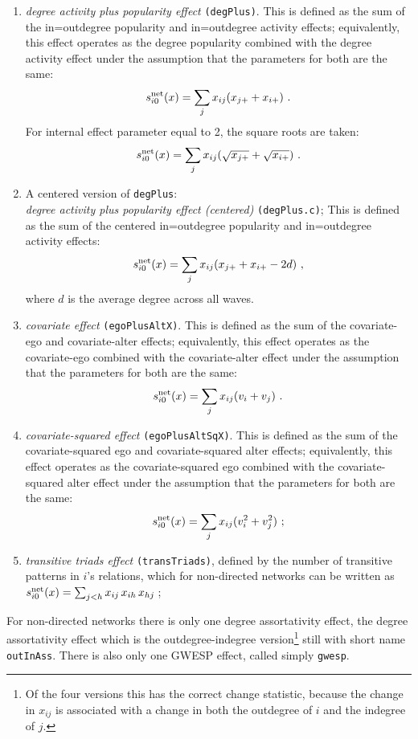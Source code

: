\documentclass[a4paper,fleqn,11pt]{article}
\newcommand{\+}{\, + \,}
\newcommand{\vit}{\theenumi}
\begin{document}
\begin{enumerate}
\item \emph{degree activity plus popularity effect} \texttt{(degPlus)}.
     This is defined as the sum of the in=outdegree popularity
     and in=outdegree activity effects; equivalently, this effect
     operates as the degree popularity combined with the degree activity effect
     under the assumption that the parameters for both are the same:
\[
 s^{\rm net}_{i\vit}(x) = \sum_j x_{ij} (x_{j+} + x_{i+}) \ .
\]
    For internal effect parameter equal to 2, the square roots are taken:
\[
 s^{\rm net}_{i\vit}(x) = \sum_j x_{ij} (\sqrt{x_{j+}} + \sqrt{x_{i+}}) \ .
\]
\item A centered version of \texttt{degPlus}:\\
      \emph{degree activity plus popularity effect (centered)} \texttt{(degPlus.c)};
     This is defined as the sum of the centered in=outdegree popularity
     and in=outdegree activity effects:
\[
 s^{\rm net}_{i\vit}(x) = \sum_j x_{ij} (x_{j+} + x_{i+} - 2 d) \ ,
\]
   where $d$ is the average degree across all waves.
\item \emph{covariate effect} \texttt{(egoPlusAltX)}.
     This is defined as the sum of the covariate-ego and
     covariate-alter effects; equivalently, this effect
     operates as the covariate-ego combined with the covariate-alter effect
     under the assumption that the parameters for both are the same:
\[
 s^{\rm net}_{i\vit}(x) = \sum_j x_{ij} (v_i + v_j) \ .
\]
\item \emph{covariate-squared effect} \texttt{(egoPlusAltSqX)}.
     This is defined as the sum of the covariate-squared ego and
     covariate-squared alter effects; equivalently, this effect
     operates as the covariate-squared ego combined with the
     covariate-squared alter effect
     under the assumption that the parameters for both are the same:
\[
 s^{\rm net}_{i\vit}(x) = \sum_j x_{ij} (v_i^2 + v_j^2) \ ;
\]
  \item {\em transitive triads effect} \texttt{(transTriads)},
   defined by the number of transitive patterns in $i$'s relations,
   which for non-directed networks can be written as\\
 $s^{\rm net}_{i\vit}(x) =  \sum_{j < h} x_{ij}\, x_{ih}\, x_{hj}\,$;\\
\end{enumerate}
For non-directed networks there is only one degree assortativity effect,
the degree assortativity effect which is the outdegree-indegree
version\footnote{Of the four versions this has the correct change statistic,
because the change in $x_{ij}$ is associated with a change
in both the outdegree of $i$ and the indegree of $j$.}
still with short name \texttt{outInAss}.
There is also only one GWESP effect, called simply \texttt{gwesp}.
\end{document}
